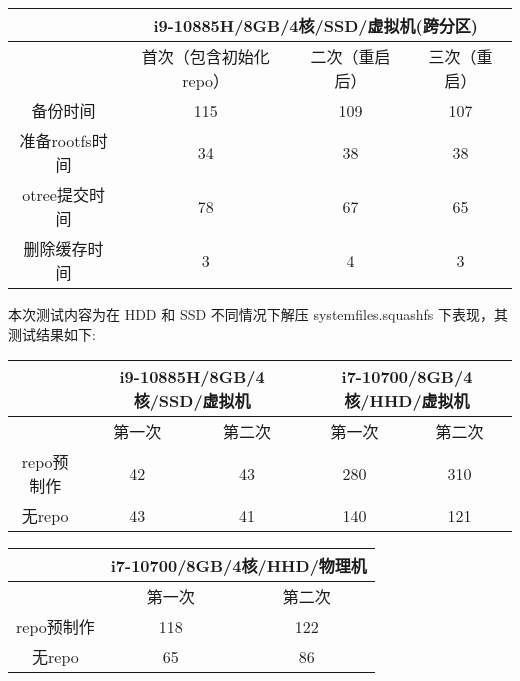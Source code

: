 \documentclass{utart}
\begin{document}
\begin{table}[H]
  \begin{tabular}{|c|ccc|}
  \hline
              & \multicolumn{3}{c|}{i9-10885H/8GB/4核/SSD/虚拟机(跨分区)}                         \\ \hline
              & \multicolumn{1}{c|}{首次（包含初始化repo）} & \multicolumn{1}{c|}{二次（重启后）} & 三次（重启） \\ \hline
  备份时间       & \multicolumn{1}{c|}{115}           & \multicolumn{1}{c|}{109}     & 107    \\ \hline
  准备rootfs时间 & \multicolumn{1}{c|}{34}            & \multicolumn{1}{c|}{38}      & 38     \\ \hline
  otree提交时间  & \multicolumn{1}{c|}{78}            & \multicolumn{1}{c|}{67}      & 65     \\ \hline
  删除缓存时间     & \multicolumn{1}{c|}{3}             & \multicolumn{1}{c|}{4}       & 3      \\ \hline
  \end{tabular}
  \end{table}
本次测试内容为在 HDD 和 SSD 不同情况下解压 systemfiles.squashfs 下表现，其测试结果如下:
\begin{table}[H]
  \begin{tabular}{|c|cc|cc|}
  \hline
   & \multicolumn{2}{c|}{i9-10885H/8GB/4核/SSD/虚拟机} & \multicolumn{2}{c|}{i7-10700/8GB/4核/HHD/虚拟机} \\ \hline
                          & \multicolumn{1}{c|}{第一次} & 第二次 & \multicolumn{1}{c|}{第一次} & 第二次 \\ \hline
  repo预制作 & \multicolumn{1}{c|}{42}  & 43  & \multicolumn{1}{c|}{280} & 310 \\ \hline
  无repo   & \multicolumn{1}{c|}{43}  & 41  & \multicolumn{1}{c|}{140} & 121 \\ \hline
  \end{tabular}
  \end{table}
\begin{table}[H]
  \begin{tabular}{|c|cc|}
  \hline
                          & \multicolumn{2}{c|}{i7-10700/8GB/4核/HHD/物理机} \\ \hline
                          & \multicolumn{1}{c|}{第一次}        & 第二次        \\ \hline
  repo预制作 & \multicolumn{1}{c|}{118}        & 122        \\ \hline
  无repo   & \multicolumn{1}{c|}{65}         & 86         \\ \hline
  \end{tabular}
  \end{table}
  
\end{document}
